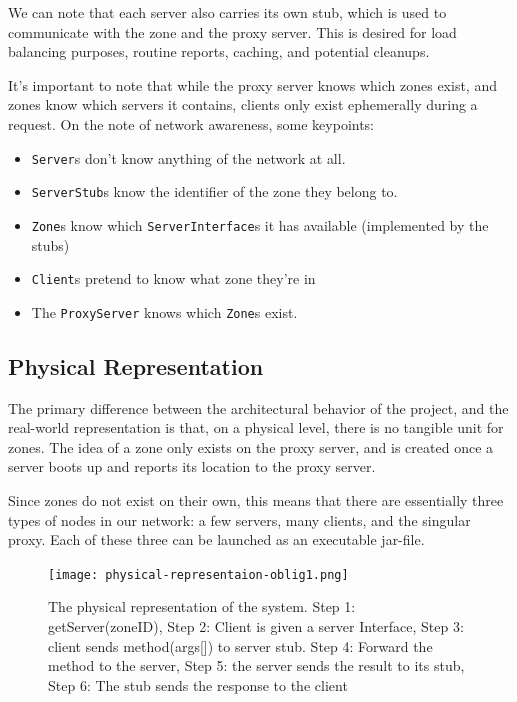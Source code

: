 \documentclass{article}
\def\code#1{\colorbox{gray!20}{\texttt{#1}}}
\begin{document}
We can note that each server also carries its own stub, which is used to communicate with the zone and the proxy server. This is desired for load balancing purposes, routine reports, caching, and potential cleanups.

It's important to note that while the proxy server knows which zones exist, and zones know which servers it contains, clients only exist ephemerally during a request. On the note of network awareness, some keypoints:

\begin{itemize}
    \item \code{Server}s don't know anything of the network at all.
    \item \code{ServerStub}s know the identifier of the zone they belong to.
    \item \code{Zone}s know which \code{ServerInterface}s it has available (implemented by the stubs)
    \item \code{Client}s pretend to know what zone they're in
    \item The \code{ProxyServer} knows which \code{Zone}s exist. 
\end{itemize}

\subsection{Physical Representation}
The primary difference between the architectural behavior of the project, and the real-world representation is that, on a physical level, there is no tangible unit for zones. The idea of a zone only exists on the proxy server, and is created once a server boots up and reports its location to the proxy server.

Since zones do not exist on their own, this means that there are essentially three types of nodes in our network: a few servers, many clients, and the singular proxy. Each of these three can be launched as an executable jar-file.

\begin{figure}[H]
    \centering
    \texttt{[image: physical-representaion-oblig1.png]}
    \captionsetup{font=footnotesize}
    \caption{The physical representation of the system. Step 1: getServer(zoneID), Step 2: Client is given a server Interface, Step 3: client sends method(args[]) to server stub. Step 4: Forward the method to the server, Step 5: the server sends the result to its stub, Step 6: The stub sends the response to the client}
    \label{fig:enter-label}
\end{figure}
\end{document}
